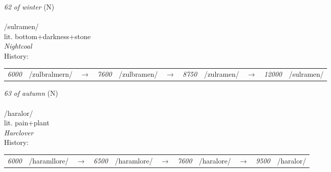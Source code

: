 \vspace{15pt}
\begin{nopagebreak}
 \textit{62 of winter} (N)\\
\\
\noindent /sulr{\textprimstress}amen/\\
\noindent lit. bottom+darkness+stone\\
\noindent \textit{Nightcoal}\\


\noindent History:

\vspace{-0pt}
\hspace{40pt}
\begin{tabular}{ccc}
\textit{6000} & /zulbralmern/&$\rightarrow$ & \textit{7600} & /zulbramen/&$\rightarrow$ & \textit{8750} & /zulramen/&$\rightarrow$ & \textit{12000} & /sulramen/& \\
\end{tabular}

\vspace{20pt}\hline

\end{nopagebreak}
\filbreak



\vspace{15pt}
\begin{nopagebreak}
 \textit{63 of autumn} (N)\\
\\
\noindent /har{\textprimstress}alor/\\
\noindent lit. pain+plant\\
\noindent \textit{Harclover}\\


\noindent History:

\vspace{-0pt}
\hspace{40pt}
\begin{tabular}{ccc}
\textit{6000} & /haramllore/&$\rightarrow$ & \textit{6500} & /haramlore/&$\rightarrow$ & \textit{7600} & /haralore/&$\rightarrow$ & \textit{9500} & /haralor/& \\
\end{tabular}

\vspace{20pt}\hline

\end{nopagebreak}
\filbreak



